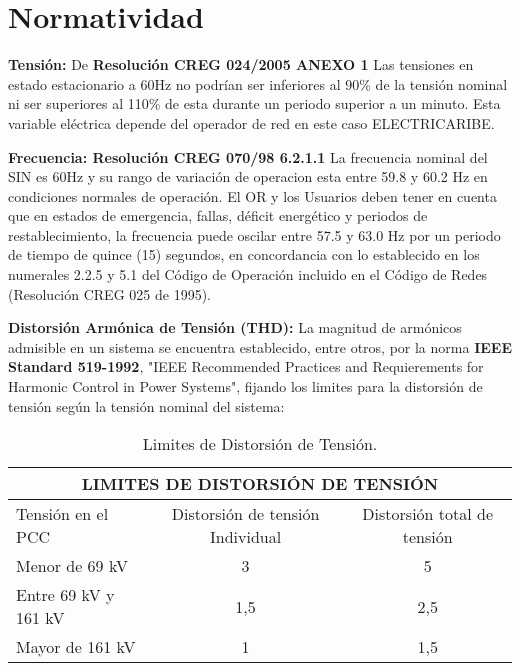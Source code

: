 \chapter{Normatividad} \label{sec:Normatividad}

\textbf{Tensión:} De \textbf{Resolución CREG 024/2005 ANEXO 1} Las tensiones en estado estacionario a 60Hz no podrían ser inferiores al 90\% de la tensión nominal ni ser superiores al 110\% de esta durante un periodo superior a un minuto. Esta variable eléctrica depende del operador de red en este caso ELECTRICARIBE.

\textbf{Frecuencia: Resolución CREG 070/98 6.2.1.1} La frecuencia nominal del SIN es 60Hz y su rango de variación de operacion esta entre 59.8 y 60.2 Hz en condiciones normales de operación. El OR y los Usuarios deben tener en cuenta que en estados de emergencia, fallas, déficit energético y periodos de restablecimiento, la frecuencia puede oscilar entre 57.5 y 63.0 Hz por un periodo de tiempo de quince (15) segundos, en concordancia con lo establecido en los numerales 2.2.5 y 5.1 del Código de Operación incluido en el Código de Redes (Resolución CREG 025 de 1995).

\textbf{Distorsión Armónica de Tensión (THD):} La magnitud de armónicos admisible en un sistema se encuentra establecido, entre otros, por la norma \textbf{IEEE Standard 519-1992}, "IEEE Recommended Practices and Requierements for Harmonic Control in Power Systems", fijando los limites para la distorsión de tensión según la tensión nominal del sistema:

\begin{table}[H]
\small
\begin{center}
\begin{tabular}{| l | c | c |}
 \hline
             \multicolumn{3}{|c|}{\textbf{LIMITES DE DISTORSIÓN DE TENSIÓN}}              \\
 \hline
    Tensión en el PCC    & Distorsión de tensión Individual & Distorsión total de tensión \\  
 \hline
    Menor de 69 kV       &                 3                &              5              \\
 \hline
	Entre 69 kV y 161 kV &                1,5               &             2,5             \\
 \hline
	Mayor de 161 kV      &                 1                &             1,5             \\
 \hline
\end{tabular}
\caption{Limites de Distorsión de Tensión.}
\label{Table:Limites_Distor_Tension}
\end{center}
\end{table}

